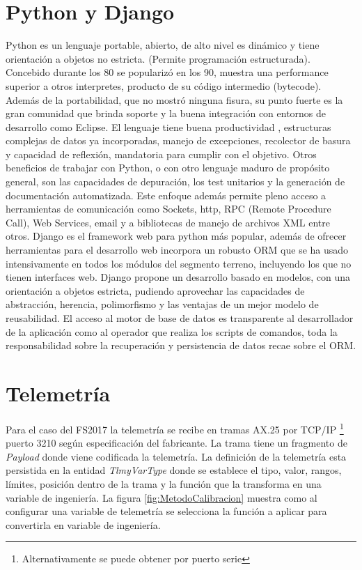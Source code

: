 \documentclass[twoside,twocolumn]{article}
\begin{document}
\section{Python y Django}

Python es un lenguaje portable, abierto, de alto nivel es dinámico y tiene orientación a objetos no estricta. (Permite programación estructurada). Concebido durante los 80 se popularizó en los 90, muestra una performance superior a otros interpretes, producto de su código intermedio (bytecode). Además de la portabilidad, que no mostró ninguna fisura, su punto fuerte es la gran comunidad que brinda soporte y la buena integración con entornos de desarrollo como Eclipse.  El lenguaje tiene buena productividad \cite{prechelt2000empirical}, estructuras complejas de datos ya incorporadas, manejo de excepciones, recolector de basura y capacidad de reflexión, mandatoria para cumplir con el objetivo. Otros beneficios de trabajar con Python, o con otro lenguaje maduro de propósito general, son las capacidades de depuración, los test unitarios y la generación de documentación automatizada. Este enfoque además permite pleno acceso a herramientas de comunicación como Sockets, http, RPC (Remote Procedure Call), Web Services, email y a bibliotecas de manejo de archivos XML entre otros. 
Django es el framework web para python más popular, además de ofrecer herramientas para el desarrollo web incorpora un robusto ORM que se ha usado intensivamente en todos los módulos del segmento terreno, incluyendo los que no tienen interfaces web. Django propone un desarrollo basado en modelos, con una orientación a objetos estricta, pudiendo aprovechar las capacidades de abstracción, herencia, polimorfismo y las ventajas de un mejor modelo de reusabilidad. El acceso al motor de base de datos es transparente al desarrollador de la aplicación como al operador que realiza los scripts de comandos, toda la responsabilidad sobre la recuperación y persistencia de datos recae sobre el ORM.  


\section{Telemetría}
\label{sec:telemetria}

Para el caso del FS2017 la telemetría se recibe en tramas AX.25 por TCP/IP \footnote{Alternativamente se puede obtener por puerto serie} puerto 3210 según especificación del fabricante. La trama tiene un fragmento de \textit{Payload} donde viene codificada la telemetría. La definición de la telemetría esta persistida en la entidad \textit{TlmyVarType} donde se establece el tipo, valor, rangos, límites, posición dentro de la trama y la función que la transforma en una variable de ingeniería. La figura \ref{fig:MetodoCalibracion} muestra como al configurar una variable de telemetría se selecciona la función a aplicar para convertirla en variable de ingeniería.
\end{document}
